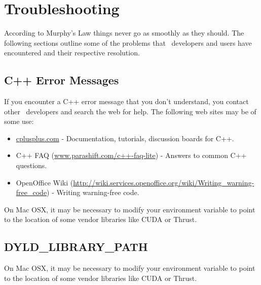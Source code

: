 
\section{Troubleshooting}

According to Murphy's Law things never go as smoothly as they should.
The following sections outline some of the problems that
\draco\ developers and users have encountered and their respective
resolution.

\subsection{C++ Error Messages}

If you encounter a C++ error message that you don't understand, you contact other \draco\ developers and search the web for help.  The following web sites may be of some use:
\begin{itemize}
\item \url{cplusplus.com} - Documentation, tutorials, discussion boards for C++.
\item C++ FAQ (\url{www.parashift.com/c++-faq-lite}) -  Answers to common C++ questions.
\item OpenOffice Wiki (\url{http://wiki.services.openoffice.org/wiki/Writing_warning-free_code}) - Writing warning-free code.
\end{itemize}

On Mac OSX, it may be necessary to modify your
 environment variable to point to the
location of some vendor libraries like CUDA or Thrust.

\subsection{DYLD\_LIBRARY\_PATH}

On Mac OSX, it may be necessary to modify your
 environment variable to point to the
location of some vendor libraries like CUDA or Thrust.




